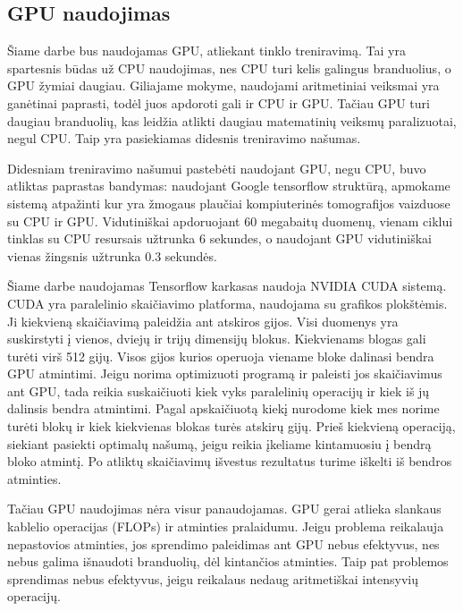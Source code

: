 \documentclass{VUMIFInfKursinis}
\begin{document}
\subsection{GPU naudojimas}
\par
Šiame darbe bus naudojamas GPU, atliekant tinklo treniravimą. Tai yra spartesnis būdas už CPU
naudojimas, nes CPU turi kelis galingus branduolius, o GPU žymiai daugiau. Giliajame mokyme,
naudojami aritmetiniai veiksmai yra ganėtinai paprasti, todėl juos apdoroti gali ir CPU ir GPU.
Tačiau GPU turi daugiau branduolių, kas leidžia atlikti daugiau matematinių veiksmų paralizuotai,
negul CPU. Taip yra pasiekiamas didesnis treniravimo našumas.
\par
Didesniam treniravimo našumui pastebėti naudojant GPU, negu CPU, buvo atliktas paprastas bandymas:
naudojant Google tensorflow struktūrą, apmokame sistemą atpažinti kur yra žmogaus plaučiai kompiuterinės
tomografijos vaizduose su CPU ir GPU. Vidutiniškai apdoruojant 60 megabaitų duomenų, vienam ciklui
tinklas su CPU resursais užtrunka 6 sekundes, o naudojant GPU vidutiniškai vienas žingsnis užtrunka
0.3 sekundės.
\par
Šiame darbe naudojamas Tensorflow karkasas naudoja NVIDIA CUDA sistemą. \cite{salt4}
CUDA yra paralelinio skaičiavimo platforma, naudojama su grafikos plokštėmis. \cite{salt5}
Ji kiekvieną skaičiavimą paleidžia ant atskiros gijos. Visi duomenys yra suskirstyti
į vienos, dviejų ir trijų dimensijų blokus. Kiekvienams blogas gali turėti virš 512
gijų. Visos gijos kurios operuoja viename bloke dalinasi bendra GPU atmintimi.
Jeigu norima optimizuoti programą ir paleisti jos skaičiavimus ant GPU, tada reikia
suskaičiuoti kiek vyks paralelinių operacijų ir kiek iš jų dalinsis bendra atmintimi.
Pagal apskaičiuotą kiekį nurodome kiek mes norime turėti blokų ir kiek kiekvienas blokas
turės atskirų gijų. Prieš kiekvieną operaciją, siekiant pasiekti optimalų našumą, jeigu
reikia įkeliame kintamuosiu į bendrą bloko atmintį. Po atliktų skaičiavimų išvestus
rezultatus turime iškelti iš bendros atminties.
\par
Tačiau GPU naudojimas nėra visur panaudojamas. GPU gerai atlieka slankaus kablelio
operacijas (FLOPs) ir atminties pralaidumu. Jeigu problema reikalauja nepastovios atminties,
jos sprendimo paleidimas ant GPU nebus efektyvus, nes nebus galima išnaudoti branduolių,
dėl kintančios atminties. Taip pat problemos sprendimas nebus efektyvus, jeigu
reikalaus nedaug aritmetiškai intensyvių operacijų.
\end{document}
